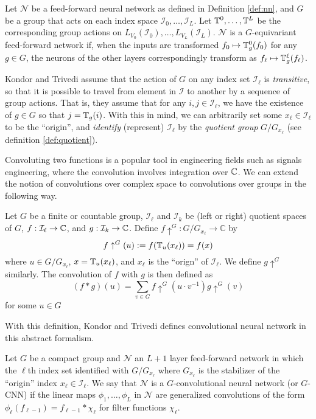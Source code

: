 \begin{definition}
	Let $\mathcal{N}$ be a feed-forward neural network as defined in Definition \ref{def:nn}, and $G$ be a group that acts on each index space $\mathcal{I}_0,\ldots,\mathcal{I}_L$.
	Let $\mathbb{T}^0,\ldots,\mathbb{T}^L$ be the corresponding group actions on $L_{V_0}(\mathcal{I}_0),\ldots,L_{V_L}(\mathcal{I}_L)$.
	$\mathcal{N}$ is a $G$-equivariant feed-forward network if, when the inputs are transformed $f_0 \mapsto \mathbb{T}_g^0(f_0)$ for any $g \in G$, the neurons of the other layers correspondingly transform as $f_\ell \mapsto \mathbb{T}_g^\ell(f_{\ell})$.
\end{definition}

Kondor and Trivedi assume that the action of $G$ on any index set $\mathcal{I}_{\ell}$ is \textit{transitive}, so that it is possible to travel from element in $\mathcal{I}$ to another by a sequence of group actions.
That is, they assume that for any $i,j \in \mathcal{I}_{\ell}$, we have the existence of $g \in G$ so that $j = \mathbb{T}_g(i)$.
With this in mind, we can arbitrarily set some $x_{\ell} \in \mathcal{I}_{\ell}$ to be the ``origin'', and \textit{identify} (represent) $\mathcal{I}_{\ell}$ by the \textit{quotient group} $G/G_{x_{\ell}}$ (see definition \ref{def:quotient}).

Convoluting two functions is a popular tool in engineering fields such as signals engineering, where the convolution involves integration over $\mathbb{C}$.
We can extend the notion of convolutions over complex space to convolutions over groups in the following way.


\begin{definition} \label{def:convolution}
	Let $G$ be a finite or countable group, $\mathcal{I}_{\ell}$ and $\mathcal{I}_{k}$ be (left or right) quotient spaces of $G$, $f: \mathcal{I}_{\ell} \to \mathbb{C}$, and $g: \mathcal{I}_{k} \to \mathbb{C}$.
	Define $f\uparrow^G: G/G_{x_{\ell}} \to \mathbb{C}$ by
	$$
		f\uparrow^G(u) := f(\mathbb{T}_u(x_{\ell})) = f(x)
	$$
	where $u \in G/G_{x_{\ell}}$, $x = \mathbb{T}_u(x_{\ell})$, and $x_{\ell}$ is the ``orign'' of $\mathcal{I}_{\ell}$.
	We define $g\uparrow^G$ similarly.
	The convolution of $f$ with $g$ is then defined as
	$$
		(f * g)(u) = \sum_{v \in G} f \uparrow^G(u \cdot v^{-1})g\uparrow^G(v)
	$$
	for some $u \in G$
\end{definition}

With this definition, Kondor and Trivedi defines convolutional neural network in this abstract formalism.
\begin{definition}
	Let $G$ be a compact group and $\mathcal{N}$ an $L+1$ layer feed-forward network in which the $\ell$th index set identified with $G/G_{x_{\ell}}$ where $G_{x_{\ell}}$ is the stabilizer of the ``origin'' index $x_{\ell} \in \mathcal{I}_{\ell}$.
	We say that $\mathcal{N}$ is a $G$-convolutional neural network (or $G$-CNN) if the linear maps $\phi_1,\ldots,\phi_L$ in $\mathcal{N}$ are generalized convolutions of the form $\phi_{\ell}(f_{\ell-1}) = f_{\ell-1} * \chi_{\ell}$ for filter functions $\chi_{\ell}$.
\end{definition}


